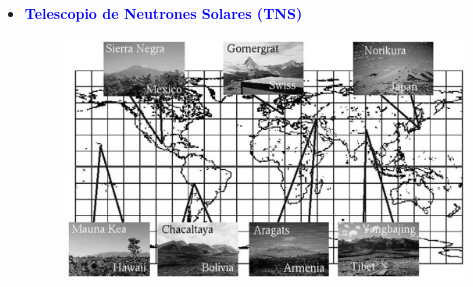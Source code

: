 \begin{frame}{}
\begin{columns}
\begin{column}{0.5\textwidth}
\begin{itemize}
                     \item \textcolor{blue}{\textbf{Telescopio de Neutrones Solares (TNS)}}
                     \begin{figure}
                         \centering
                         \includegraphics[width=0.6\linewidth]{Figures/TNS_NETWORK.png}
                     \end{figure}                     
                \end{itemize}
            \end{column}            
        \end{columns}        

    \end{frame}